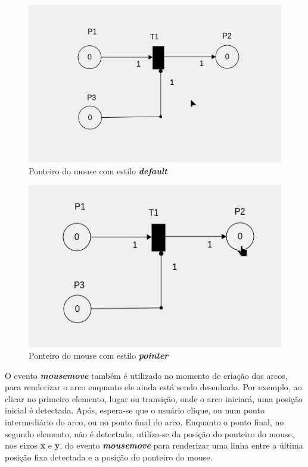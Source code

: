 \documentclass[
	12pt,				%
	openright,			%
	oneside,			%
	a4paper,			%
	english,			%
	brazil				%
	]{abntex2}
\begin{document}
\begin{figure}[ht] 
	\centering
	\includegraphics[scale=0.4]{figuras/mouse_estilo_default.png}
	\caption[Mouse estilo default]{Ponteiro do mouse com estilo \textbf{\textit{default}}}
	\label{fig:mouse_estilo_default}
\end{figure}

\begin{figure}[ht] 
	\centering
	\includegraphics[scale=0.4]{figuras/mouse_estilo_pointer.png}
	\caption[Mouse estilo default]{Ponteiro do mouse com estilo \textbf{\textit{pointer}}}
	\label{fig:mouse_estilo_pointer}
\end{figure}

O evento \textbf{\textit{mousemove}} também é utilizado no momento de criação dos arcos, para renderizar o arco enquanto ele ainda está sendo desenhado. Por exemplo, ao clicar no primeiro elemento, lugar ou transição, onde o arco iniciará, uma posição inicial é detectada. Após, espera-se que o usuário clique, ou num ponto intermediário do arco, ou no ponto final do arco. Enquanto o ponto final, no segundo elemento, não é detectado, utiliza-se da posição do ponteiro do mouse, nos eixos \textbf{x} e \textbf{y}, do evento \textbf{\textit{mousemove}} para renderizar uma linha entre a última posição fixa detectada e a posição do ponteiro do mouse.
\end{document}
